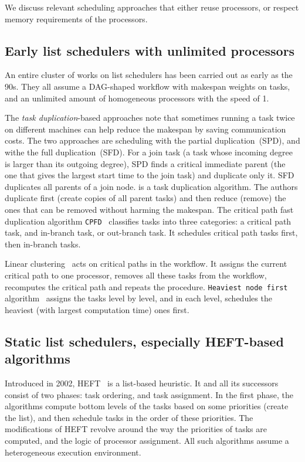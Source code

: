 \documentclass[conference]{IEEEtran}
\begin{document}
    We discuss relevant scheduling approaches that either reuse processors, or respect memory requirements of the processors.

    \subsection{Early list schedulers with unlimited processors}
    An entire cluster of works on list schedulers has been carried out as early as the 90s.
    They all assume a DAG-shaped workflow with makespan weights on tasks, and an unlimited amount of homogeneous processors
    with the speed of 1.

    The \textit{task duplication}-based approaches note that sometimes running a task twice on different machines can
    help reduce the makespan by saving communication costs.
    The two approaches are scheduling with the partial duplication~(SPD), and withe the full duplication~(SFD).
    For a join task (a task whose incoming degree is larger than its outgoing degree), SPD finds a critical immediate
    parent (the one that gives the largest start time to the join task) and duplicate only it.
    SFD duplicates all parents of a join node.
    \cite{dfrn1997} is a task duplication algorithm.
    The authors duplicate first (create copies of all parent tasks) and then reduce (remove) the ones that can be removed without harming
    the makespan.
    The critical path fast duplication algorithm \texttt{CPFD}~\cite{5727760} classifies tasks into three categories: a critical
    path task, and in-branch task, or out-branch task.
    It schedules critical path tasks first, then in-branch tasks.

    Linear clustering~\cite{KWOK1999381} acts on critical paths in the workflow.
    It assigns the current critical path to one processor, removes all these tasks from the workflow, recomputes the critical
    path and repeats the procedure.
    \texttt{Heaviest node first} algorithm~\cite{SHIRAZI1990222} assigns the tasks level by level, and in each level,
    schedules the heaviest (with largest computation time)  ones first.


    \subsection{Static list schedulers, especially HEFT-based algorithms}

    Introduced in 2002, HEFT~\cite{topcuoglu2002performance} is a list-based heuristic.
    It and all its successors consist of two phases: task ordering, and task assignment.
    In the first phase, the algorithms compute bottom levels of the tasks based on some priorities (create the list),
    and then schedule tasks in the order of these priorities.
    The modifications of HEFT revolve around the way the priorities of tasks are computed, and the logic
    of processor assignment.
    All such algorithms assume a heterogeneous execution environment.
\end{document}
